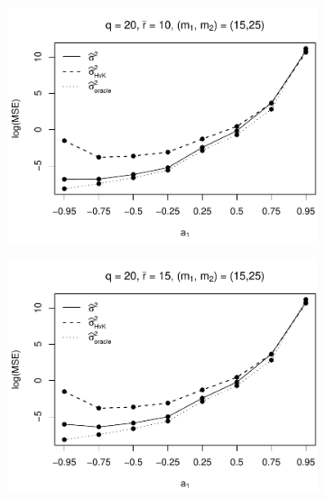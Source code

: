 \begin{figure}[p]
\begin{subfigure}[b]{0.45\textwidth}
\includegraphics[width=\textwidth]{Plots/Robustness/MSE_lrv_T=500_slope=10_(q,K1,K2,M1,M2)=(20,2,10,15,25).pdf}
\end{subfigure}
\hspace{0.25cm}
\begin{subfigure}[b]{0.45\textwidth}
\includegraphics[width=\textwidth]{Plots/Robustness/MSE_lrv_T=500_slope=10_(q,K1,K2,M1,M2)=(20,2,15,15,25).pdf}
\end{subfigure}


\end{figure}
